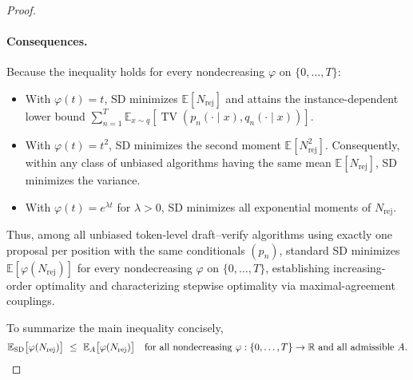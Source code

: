 \begin{proof}
\paragraph{Consequences.}
Because the inequality holds for every nondecreasing $\varphi$ on $\{0,\dots,T\}$:
\begin{itemize}
  \item With $\varphi(t)=t$, SD minimizes $\mathbb E[N_{\mathrm{rej}}]$ and attains the instance-dependent lower bound $\sum_{n=1}^T\mathbb E_{x\sim q}[\operatorname{TV}(p_n(\cdot\mid x),q_n(\cdot\mid x))]$.
  \item With $\varphi(t)=t^2$, SD minimizes the second moment $\mathbb E[N_{\mathrm{rej}}^2]$. Consequently, within any class of unbiased algorithms having the same mean $\mathbb E[N_{\mathrm{rej}}]$, SD minimizes the variance.
  \item With $\varphi(t)=e^{\lambda t}$ for $\lambda>0$, SD minimizes all exponential moments of $N_{\mathrm{rej}}$.
\end{itemize}
Thus, among all unbiased token-level draft--verify algorithms using exactly one proposal per position with the same conditionals $(p_n)$, standard SD minimizes $\mathbb E[\varphi(N_{\mathrm{rej}})]$ for every nondecreasing $\varphi$ on $\{0,\dots,T\}$, establishing increasing-order optimality and characterizing stepwise optimality via maximal-agreement couplings.\par\medskip
To summarize the main inequality concisely,
\[
\mathbb E_{\mathrm{SD}}\big[\varphi(N_{\mathrm{rej}})\big]\ \le\ \mathbb E_A\big[\varphi(N_{\mathrm{rej}})\big]\quad\text{for all nondecreasing $\varphi:\{0,\dots,T\}\to\mathbb R$ and all admissible $A$.}\qedhere
\]
\end{proof}
